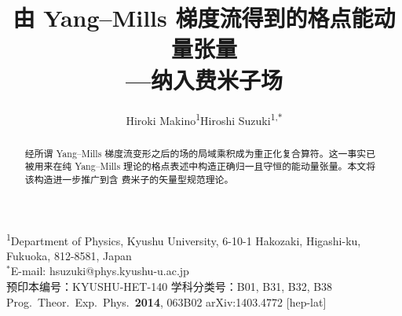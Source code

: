 \documentclass[11pt]{ctexart}
\title{由 Yang--Mills 梯度流得到的格点能动量张量\\---纳入费米子场}
\author{Hiroki Makino\textsuperscript{1}\qquad Hiroshi Suzuki\textsuperscript{1,$\ast$}}
\date{}
\numberwithin{equation}{section}
\begin{document}
\maketitle

\begin{abstract}
经所谓 Yang--Mills 梯度流变形之后的场的局域乘积成为重正化复合算符。这一事实已被用来在纯
Yang--Mills 理论的格点表述中构造正确归一且守恒的能动量张量。本文将该构造进一步推广到含
费米子的矢量型规范理论。
\end{abstract}

\begin{center}\small
\textsuperscript{1}Department of Physics, Kyushu University, 6-10-1 Hakozaki,
Higashi-ku, Fukuoka, 812-8581, Japan\\
$^{\ast}$E-mail: hsuzuki@phys.kyushu-u.ac.jp\\[2pt]
预印本编号：KYUSHU-HET-140 \quad 学科分类号：B01, B31, B32, B38\\
Prog.\ Theor.\ Exp.\ Phys.\ \textbf{2014}, 063B02 \quad arXiv:1403.4772 [hep-lat]
\end{center}








\end{document}
